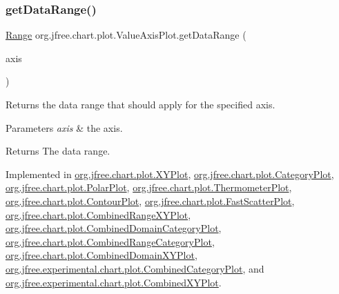 \subsubsection{\texorpdfstring{get\+Data\+Range()}{getDataRange()}}
{\footnotesize\ttfamily \mbox{\hyperlink{classorg_1_1jfree_1_1data_1_1_range}{Range}} org.\+jfree.\+chart.\+plot.\+Value\+Axis\+Plot.\+get\+Data\+Range (\begin{DoxyParamCaption}\item[{\mbox{\hyperlink{classorg_1_1jfree_1_1chart_1_1axis_1_1_value_axis}{Value\+Axis}}}]{axis }\end{DoxyParamCaption})}

Returns the data range that should apply for the specified axis.


\begin{DoxyParams}{Parameters}
{\em axis} & the axis.\\
\hline
\end{DoxyParams}
\begin{DoxyReturn}{Returns}
The data range. 
\end{DoxyReturn}


Implemented in \mbox{\hyperlink{classorg_1_1jfree_1_1chart_1_1plot_1_1_x_y_plot_a69bd0446d06cc7002be74bba4ed12520}{org.\+jfree.\+chart.\+plot.\+X\+Y\+Plot}}, \mbox{\hyperlink{classorg_1_1jfree_1_1chart_1_1plot_1_1_category_plot_a24ad189c085ce4d54b3c9bfbe18b9460}{org.\+jfree.\+chart.\+plot.\+Category\+Plot}}, \mbox{\hyperlink{classorg_1_1jfree_1_1chart_1_1plot_1_1_polar_plot_ae99b116f3485ce4f6ad153f75153eee3}{org.\+jfree.\+chart.\+plot.\+Polar\+Plot}}, \mbox{\hyperlink{classorg_1_1jfree_1_1chart_1_1plot_1_1_thermometer_plot_a7521168336c8233ccb78d493a5612b81}{org.\+jfree.\+chart.\+plot.\+Thermometer\+Plot}}, \mbox{\hyperlink{classorg_1_1jfree_1_1chart_1_1plot_1_1_contour_plot_af6342c1dfe5a7e570d22a3a039574ac5}{org.\+jfree.\+chart.\+plot.\+Contour\+Plot}}, \mbox{\hyperlink{classorg_1_1jfree_1_1chart_1_1plot_1_1_fast_scatter_plot_ac8cbf1df42548efb7ec92d0c148ab496}{org.\+jfree.\+chart.\+plot.\+Fast\+Scatter\+Plot}}, \mbox{\hyperlink{classorg_1_1jfree_1_1chart_1_1plot_1_1_combined_range_x_y_plot_af8ecace356fe3b8cf664bf3f2a48742f}{org.\+jfree.\+chart.\+plot.\+Combined\+Range\+X\+Y\+Plot}}, \mbox{\hyperlink{classorg_1_1jfree_1_1chart_1_1plot_1_1_combined_domain_category_plot_a128fef2bff06d3fbe79052b3546e9305}{org.\+jfree.\+chart.\+plot.\+Combined\+Domain\+Category\+Plot}}, \mbox{\hyperlink{classorg_1_1jfree_1_1chart_1_1plot_1_1_combined_range_category_plot_a1bf0007925eb1e5aab244a7a12a5ee13}{org.\+jfree.\+chart.\+plot.\+Combined\+Range\+Category\+Plot}}, \mbox{\hyperlink{classorg_1_1jfree_1_1chart_1_1plot_1_1_combined_domain_x_y_plot_a523053d6ce39485c79245c4a1bc12ed0}{org.\+jfree.\+chart.\+plot.\+Combined\+Domain\+X\+Y\+Plot}}, \mbox{\hyperlink{classorg_1_1jfree_1_1experimental_1_1chart_1_1plot_1_1_combined_category_plot_ab74684841e2fa76eec6cfd9e17a33153}{org.\+jfree.\+experimental.\+chart.\+plot.\+Combined\+Category\+Plot}}, and \mbox{\hyperlink{classorg_1_1jfree_1_1experimental_1_1chart_1_1plot_1_1_combined_x_y_plot_aaf329d72ed5675a4fc2df0cc87300924}{org.\+jfree.\+experimental.\+chart.\+plot.\+Combined\+X\+Y\+Plot}}.



